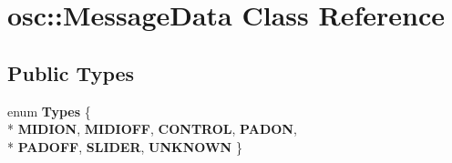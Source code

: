 \hypertarget{classosc_1_1MessageData}{}\section{osc\+:\+:Message\+Data Class Reference}
\label{classosc_1_1MessageData}
\subsection*{Public Types}
\begin{DoxyCompactItemize}
\item 
enum {\bfseries Types} \{ \\*
{\bfseries M\+I\+D\+I\+ON}, 
{\bfseries M\+I\+D\+I\+O\+FF}, 
{\bfseries C\+O\+N\+T\+R\+OL}, 
{\bfseries P\+A\+D\+ON}, 
\\*
{\bfseries P\+A\+D\+O\+FF}, 
{\bfseries S\+L\+I\+D\+ER}, 
{\bfseries U\+N\+K\+N\+O\+WN}
 \}\hypertarget{classosc_1_1MessageData_aa4971419f49aa2874d36482029c5e8e5}{}\label{classosc_1_1MessageData_aa4971419f49aa2874d36482029c5e8e5}

\end{DoxyCompactItemize}
